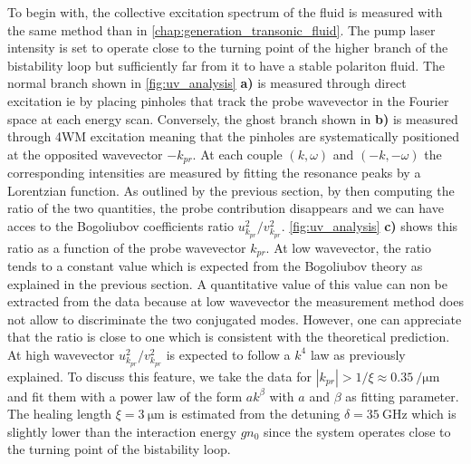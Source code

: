 \bigskip

To begin with, the collective excitation spectrum of the fluid is measured with the same method than in \autoref{chap:generation_transonic_fluid}. The pump laser intensity is set to operate close to the turning point of the higher branch of the bistability loop but sufficiently far from it to have a stable polariton fluid. 
The normal branch shown in \autoref{fig:uv_analysis} \textbf{a)} is measured through direct excitation ie by placing pinholes that track the probe wavevector in the Fourier space at each energy scan.
 Conversely, the ghost branch shown in \textbf{b)} is measured through 4WM excitation meaning that the pinholes are systematically positioned at the opposited wavevector $-k_{pr}$. At each couple $(k,\omega)$ and $(-k, -\omega)$ the corresponding intensities are measured by fitting the resonance peaks 
by a Lorentzian function. As outlined by the previous section, by then computing the ratio of the two quantities, the probe contribution disappears and we can have acces to the Bogoliubov coefficients ratio $u_{k_{pr}}^2/v_{k_{pr}}^2$. 
\autoref{fig:uv_analysis} \textbf{c)} shows this ratio as a function of the probe wavevector $k_{pr}$. At low wavevector, the ratio tends to a constant value which is expected from the Bogoliubov theory as explained in the previous section. A quantitative value of this value can non be extracted from the data
because at low wavevector the measurement method does not allow to discriminate the two conjugated modes. However, one can appreciate that the ratio is close to one which is consistent with the theoretical prediction.
At high wavevector $u_{k_{pr}}^2/v_{k_{pr}}^2$ is expected to follow a $k^4$ law as previously explained. To discuss this feature, we take the data for $|k_{pr}| > 1/\xi\approx\SI{0.35}{\per\micro\meter}$ and fit them with a power law of the form $ak^\beta$ with $a$ and $\beta$ as fitting parameter. The healing length $\xi=\SI{3}{\micro\meter}$ is estimated from the detuning $\delta =\SI{35}{\giga\hertz}$ which is slightly lower than the interaction energy $gn_0$ since the system operates close to the turning point of the bistability loop.

\bigskip

